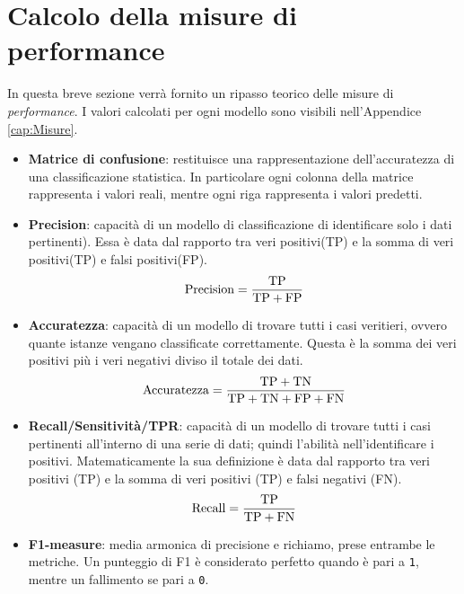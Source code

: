 		\section{Calcolo della misure di performance}
			In questa breve sezione verrà fornito un ripasso teorico delle misure di \textit{performance}. I valori calcolati per ogni modello sono visibili nell'Appendice \ref{cap:Misure}.
			\begin{itemize}
				\item \textbf{Matrice di confusione}: restituisce una rappresentazione dell'accuratezza di una classificazione statistica. In particolare ogni colonna della matrice rappresenta i valori reali, mentre ogni riga rappresenta i valori predetti.
					
				\item \textbf{Precision}: capacità di un modello di classificazione di identificare solo i dati pertinenti). Essa è data dal rapporto tra veri positivi(TP) e la somma di veri positivi(TP) e falsi positivi(FP).	
					\begin{equation}
					\text{Precision} = \frac{\text{TP}}{\text{TP} + \text{FP}} \\
					\end{equation}
				
				\item \textbf{Accuratezza}: capacità di un modello di trovare tutti i casi veritieri, ovvero quante istanze vengano classificate correttamente. Questa è la somma dei veri positivi più i veri negativi diviso il totale dei dati.
					\begin{equation}
					\text{Accuratezza} = \frac{\text{TP} + \text{TN}}{\text{TP} + \text{TN} + \text{FP} + \text{FN}} \\
					\end{equation}
				
				\item \textbf{Recall/Sensitività/TPR}: capacità di un modello di trovare tutti i casi pertinenti all’interno di una serie di dati; quindi l'abilità nell'identificare i positivi. Matematicamente la sua definizione è data dal rapporto tra veri positivi (TP) e la somma di veri positivi (TP) e falsi negativi (FN).
					\begin{equation}
					\text{Recall} = \frac{\text{TP}}{\text{TP} + \text{FN}} \\
					\end{equation}
				
				\item \textbf{F1-measure}: media armonica di precisione e richiamo, prese entrambe le metriche. Un punteggio di F1 è considerato perfetto quando è pari a \verb|1|, mentre un fallimento se pari a \verb|0|. 		
			\end{itemize}
	
